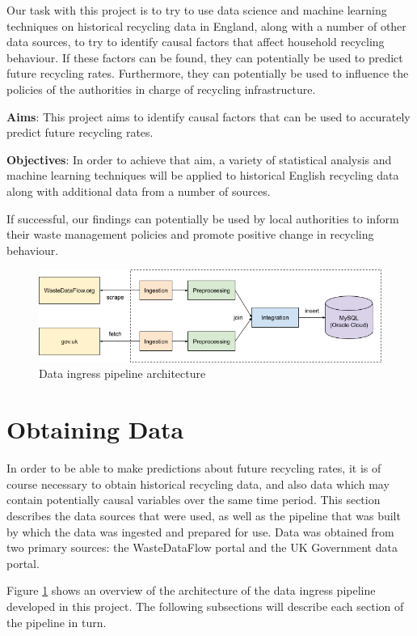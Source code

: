 \documentclass[11pt,conference]{IEEEtran}
\begin{document}
Our task with this project is to try to use data science and machine learning techniques on historical recycling data in England, along with a number of other data sources, to try to identify causal factors that affect household recycling behaviour. If these factors can be found, they can potentially be used to predict future recycling rates. Furthermore, they can potentially be used to influence the policies of the authorities in charge of recycling infrastructure. 

\textbf{Aims}: This project aims to identify causal factors that can be used to accurately predict future recycling rates. 

\textbf{Objectives}: In order to achieve that aim, a variety of statistical analysis and machine learning techniques will be applied to historical English recycling data along with additional data from a number of sources.

If successful, our findings can potentially be used by local authorities to inform their waste management policies and promote positive change in recycling behaviour.

\begin{figure}[h]
\begin{center}
\includegraphics[width=\linewidth]{figures/architecture.png}
\caption{Data ingress pipeline architecture}
\label{fig:architecture}
\end{center}
\end{figure}
\section{Obtaining Data}
In order to be able to make predictions about future recycling rates, it is of course necessary to obtain historical recycling data, and also data which may contain potentially causal variables over the same time period. This section describes the data sources that were used, as well as the pipeline that was built by which the data was ingested and prepared for use. Data was obtained from two primary sources: the WasteDataFlow portal and the UK Government data portal.

Figure \ref{fig:architecture} shows an overview of the architecture of the data ingress pipeline developed in this project. The following subsections will describe each section of the pipeline in turn.
\end{document}
